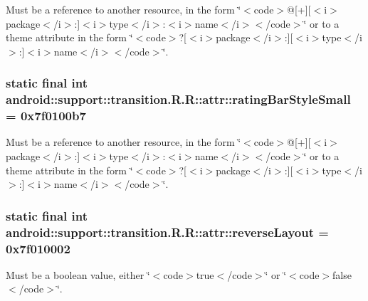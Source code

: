 Must be a reference to another resource, in the form \char`\"{}$<$code$>$@\mbox{[}+\mbox{]}\mbox{[}$<$i$>$package$<$/i$>$:\mbox{]}$<$i$>$type$<$/i$>$:$<$i$>$name$<$/i$>$$<$/code$>$\char`\"{} or to a theme attribute in the form \char`\"{}$<$code$>$?\mbox{[}$<$i$>$package$<$/i$>$:\mbox{]}\mbox{[}$<$i$>$type$<$/i$>$:\mbox{]}$<$i$>$name$<$/i$>$$<$/code$>$\char`\"{}. \hypertarget{classandroid_1_1support_1_1transition_1_1_r_1_1attr_8df42a1c8f7767a10b2dccf21d188d8e}{
\subsubsection[{ratingBarStyleSmall}]{\setlength{\rightskip}{0pt plus 5cm}static final int android::support::transition.R.R::attr::ratingBarStyleSmall = 0x7f0100b7}}
\label{classandroid_1_1support_1_1transition_1_1_r_1_1attr_8df42a1c8f7767a10b2dccf21d188d8e}


Must be a reference to another resource, in the form \char`\"{}$<$code$>$@\mbox{[}+\mbox{]}\mbox{[}$<$i$>$package$<$/i$>$:\mbox{]}$<$i$>$type$<$/i$>$:$<$i$>$name$<$/i$>$$<$/code$>$\char`\"{} or to a theme attribute in the form \char`\"{}$<$code$>$?\mbox{[}$<$i$>$package$<$/i$>$:\mbox{]}\mbox{[}$<$i$>$type$<$/i$>$:\mbox{]}$<$i$>$name$<$/i$>$$<$/code$>$\char`\"{}. \hypertarget{classandroid_1_1support_1_1transition_1_1_r_1_1attr_0c423e7834c234e91afdfbad03843482}{
\subsubsection[{reverseLayout}]{\setlength{\rightskip}{0pt plus 5cm}static final int android::support::transition.R.R::attr::reverseLayout = 0x7f010002}}
\label{classandroid_1_1support_1_1transition_1_1_r_1_1attr_0c423e7834c234e91afdfbad03843482}


Must be a boolean value, either \char`\"{}$<$code$>$true$<$/code$>$\char`\"{} or \char`\"{}$<$code$>$false$<$/code$>$\char`\"{}. 

